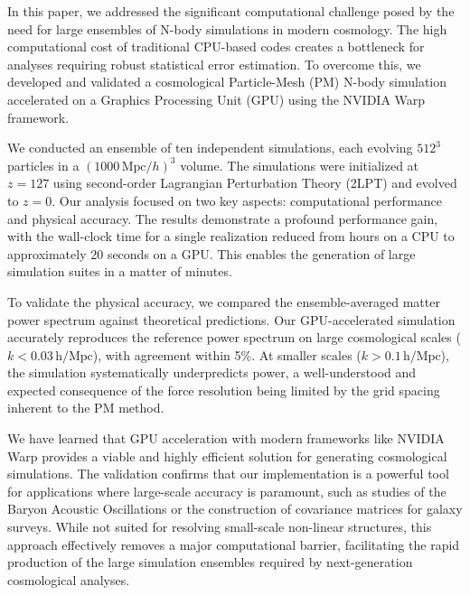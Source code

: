 \documentclass[]{article}
\begin{document}
In this paper, we addressed the significant computational challenge posed by the need for large ensembles of N-body simulations in modern cosmology. The high computational cost of traditional CPU-based codes creates a bottleneck for analyses requiring robust statistical error estimation. To overcome this, we developed and validated a cosmological Particle-Mesh (PM) N-body simulation accelerated on a Graphics Processing Unit (GPU) using the NVIDIA Warp framework.

We conducted an ensemble of ten independent simulations, each evolving $512^3$ particles in a $(1000 \, \text{Mpc}/h)^3$ volume. The simulations were initialized at $z=127$ using second-order Lagrangian Perturbation Theory (2LPT) and evolved to $z=0$. Our analysis focused on two key aspects: computational performance and physical accuracy. The results demonstrate a profound performance gain, with the wall-clock time for a single realization reduced from hours on a CPU to approximately 20 seconds on a GPU. This enables the generation of large simulation suites in a matter of minutes.

To validate the physical accuracy, we compared the ensemble-averaged matter power spectrum against theoretical predictions. Our GPU-accelerated simulation accurately reproduces the reference power spectrum on large cosmological scales ($k < 0.03 \, \text{h/Mpc}$), with agreement within 5\%. At smaller scales ($k > 0.1 \, \text{h/Mpc}$), the simulation systematically underpredicts power, a well-understood and expected consequence of the force resolution being limited by the grid spacing inherent to the PM method.

We have learned that GPU acceleration with modern frameworks like NVIDIA Warp provides a viable and highly efficient solution for generating cosmological simulations. The validation confirms that our implementation is a powerful tool for applications where large-scale accuracy is paramount, such as studies of the Baryon Acoustic Oscillations or the construction of covariance matrices for galaxy surveys. While not suited for resolving small-scale non-linear structures, this approach effectively removes a major computational barrier, facilitating the rapid production of the large simulation ensembles required by next-generation cosmological analyses.
\end{document}
